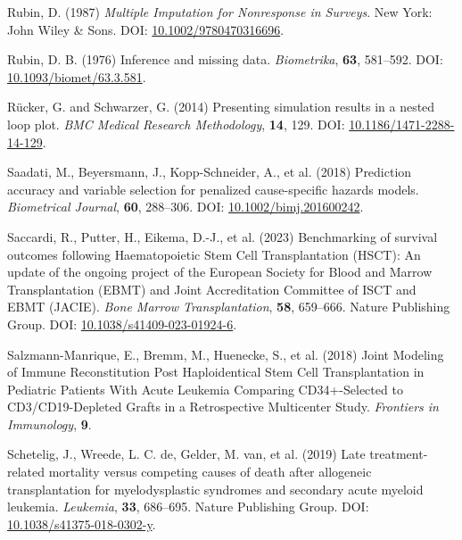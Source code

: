 \documentclass[
  letterpaper,
  DIV=11,
  numbers=noendperiod]{scrreprt}
\newlength{\cslhangindent}
\newlength{\cslentryspacingunit} %
\newenvironment{CSLReferences}[2] %
 {%
  \setlength{\parindent}{0pt}
  \ifodd #1
  \let\oldpar\par
  \def\par{\hangindent=\cslhangindent\oldpar}
  \fi
  \setlength{\parskip}{#2\cslentryspacingunit}
 }%
 {}
\begin{document}
\begin{CSLReferences}{1}{0}
\leavevmode{}%
Rubin, D. (1987) \emph{Multiple Imputation for Nonresponse in Surveys}.
New York: John Wiley \& Sons. DOI:
\href{https://doi.org/10.1002/9780470316696}{10.1002/9780470316696}.

\leavevmode{}%
Rubin, D. B. (1976) Inference and missing data. \emph{Biometrika},
\textbf{63}, 581--592. DOI:
\href{https://doi.org/10.1093/biomet/63.3.581}{10.1093/biomet/63.3.581}.

\leavevmode{}%
Rücker, G. and Schwarzer, G. (2014) Presenting simulation results in a
nested loop plot. \emph{BMC Medical Research Methodology}, \textbf{14},
129. DOI:
\href{https://doi.org/10.1186/1471-2288-14-129}{10.1186/1471-2288-14-129}.

\leavevmode{}%
Saadati, M., Beyersmann, J., Kopp-Schneider, A., et al. (2018)
Prediction accuracy and variable selection for penalized cause-specific
hazards models. \emph{Biometrical Journal}, \textbf{60}, 288--306. DOI:
\href{https://doi.org/10.1002/bimj.201600242}{10.1002/bimj.201600242}.

\leavevmode{}%
Saccardi, R., Putter, H., Eikema, D.-J., et al. (2023) Benchmarking of
survival outcomes following {Haematopoietic Stem Cell Transplantation}
({HSCT}): An update of the ongoing project of the {European Society} for
{Blood} and {Marrow Transplantation} ({EBMT}) and {Joint Accreditation
Committee} of {ISCT} and {EBMT} ({JACIE}). \emph{Bone Marrow
Transplantation}, \textbf{58}, 659--666. Nature Publishing Group. DOI:
\href{https://doi.org/10.1038/s41409-023-01924-6}{10.1038/s41409-023-01924-6}.

\leavevmode{}%
Salzmann-Manrique, E., Bremm, M., Huenecke, S., et al. (2018) Joint
{Modeling} of {Immune Reconstitution Post Haploidentical Stem Cell
Transplantation} in {Pediatric Patients With Acute Leukemia Comparing
CD34}+-{Selected} to {CD3}/{CD19-Depleted Grafts} in a {Retrospective
Multicenter Study}. \emph{Frontiers in Immunology}, \textbf{9}.

\leavevmode{}%
Schetelig, J., Wreede, L. C. de, Gelder, M. van, et al. (2019) Late
treatment-related mortality versus competing causes of death after
allogeneic transplantation for myelodysplastic syndromes and secondary
acute myeloid leukemia. \emph{Leukemia}, \textbf{33}, 686--695. Nature
Publishing Group. DOI:
\href{https://doi.org/10.1038/s41375-018-0302-y}{10.1038/s41375-018-0302-y}.


\end{CSLReferences}
\end{document}
